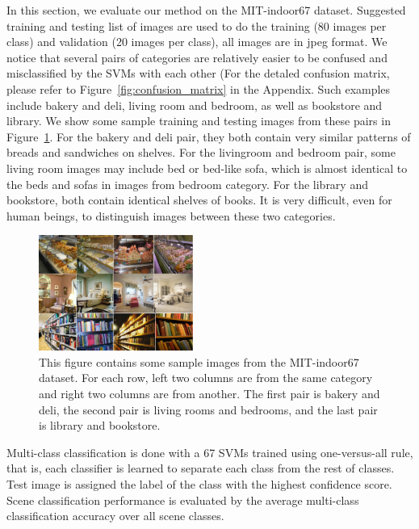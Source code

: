 
In this section, we evaluate our method on the MIT-indoor67 dataset. Suggested training and
testing list of images are used to do the training (80 images per class) and validation (20
images per class), all images are in jpeg format. We notice that several
pairs of categories are relatively easier to be confused and misclassified by the
SVMs with each other (For the detaled confusion matrix, please refer to Figure~\ref{fig:confusion_matrix} in the Appendix. Such examples include bakery and deli, living room and bedroom, as well as
bookstore and library. We show some sample training and testing images from these
pairs in Figure~\ref{fig:sample}. For the bakery and deli pair, they both contain very
similar patterns of breads and sandwiches on shelves. For the livingroom and bedroom
pair, some living room images may include bed or bed-like sofa, which is almost identical
to the beds and sofas in images from bedroom category. For the library and bookstore,
both contain identical shelves of books. It is very difficult, even for human beings, to distinguish
images between these two categories.

\begin{figure}[ht]
  \centering
  \includegraphics[width=0.45\textwidth]{img/dataset.pdf}
  \centering
  \caption{This figure contains some sample images from the MIT-indoor67 dataset.
For each row, left two columns are from the same category and right two columns are from
another. The first pair is bakery and deli, the second pair is living rooms and bedrooms, and the last pair is library and bookstore.}
\label{fig:sample}
\end{figure}

Multi-class classification is done with a 67 SVMs trained using one-versus-all rule, that is, each
classifier is learned to separate each class from the rest of classes. Test image is assigned the
label of the class with the highest confidence score. Scene classification performance is
evaluated by the average multi-class classification accuracy over all scene classes.

